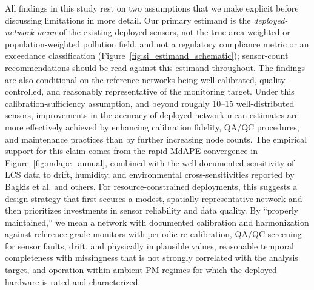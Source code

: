\documentclass[12pt]{article}
\theoremstyle{remark}
\begin{document}
All findings in this study rest on two assumptions that we make explicit before discussing limitations in more detail. Our primary estimand is the \emph{deployed-network mean} of the existing deployed sensors, not the true area-weighted or population-weighted pollution field, and not a regulatory compliance metric or an exceedance classification (Figure~\ref{fig:si_estimand_schematic}); sensor-count recommendations should be read against this estimand throughout. The findings are also conditional on the reference networks being well-calibrated, quality-controlled, and reasonably representative of the monitoring target. Under this calibration-sufficiency assumption, and beyond roughly 10--15 well-distributed sensors, improvements in the accuracy of deployed-network mean estimates are more effectively achieved by enhancing calibration fidelity, QA/QC procedures, and maintenance practices than by further increasing node counts. The empirical support for this claim comes from the rapid MdAPE convergence in Figure~\ref{fig:mdape_annual}, combined with the well-documented sensitivity of LCS data to drift, humidity, and environmental cross-sensitivities reported by Bagkis et al.\supercite{bagkis_evolving_2025-1} and others. For resource-constrained deployments, this suggests a design strategy that first secures a modest, spatially representative network and then prioritizes investments in sensor reliability and data quality. By ``properly maintained,'' we mean a network with documented calibration and harmonization against reference-grade monitors with periodic re-calibration, QA/QC screening for sensor faults, drift, and physically implausible values, reasonable temporal completeness with missingness that is not strongly correlated with the analysis target, and operation within ambient PM regimes for which the deployed hardware is rated and characterized.
\end{document}
